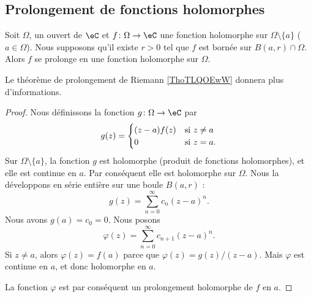 \subsection{Prolongement de fonctions holomorphes}

\begin{proposition} \label{PropDRnYkKP}
    Soit \( \Omega\), un ouvert de \( \eC\) et \( f\colon \Omega\to \eC\) une fonction holomorphe sur \( \Omega\setminus\{ a \}\) (\( a\in \Omega\)). Nous supposons qu'il existe \( r>0\) tel que \( f\) est bornée sur \( B(a,r)\cap\Omega\). Alors \( f\) se prolonge en une fonction holomorphe sur \( \Omega\).
\end{proposition}
Le théorème de prolongement de Riemann \ref{ThoTLQOEwW} donnera plus d'informations.

\begin{proof}
    Nous définissons la fonction \( g\colon \Omega\to \eC\) par
    \begin{equation}
        g(z)=\begin{cases}
            (z-a)f(z)    &   \text{si \( z\neq a\)}\\
            0    &    \text{si \( z=a\)}.
        \end{cases}
    \end{equation}
    Sur \( \Omega\setminus\{ a \}\), la fonction \( g\) est holomorphe (produit de fonctions holomorphes), et elle est continue en \( a\). Par conséquent elle est holomorphe sur \( \Omega\). Nous la développons en série entière sur une boule \( B(a,r)\) :
    \begin{equation}
        g(z)=\sum_{n=0}^{\infty}c_n(z-a)^n.
    \end{equation}
    Nous avons \( g(a)=c_0=0\). Nous posons
    \begin{equation}
        \varphi(z)=\sum_{n=0}^{\infty}c_{n+1}(z-a)^n.
    \end{equation}
    Si \( z\neq a\), alors \( \varphi(z)=f(a)\) parce que \( \varphi(z)=g(z)/(z-a)\). Mais \( \varphi\) est continue en \( a\), et donc holomorphe en \( a\).

    La fonction \( \varphi\) est par conséquent un prolongement holomorphe de \( f\) en \( a\).
\end{proof}

